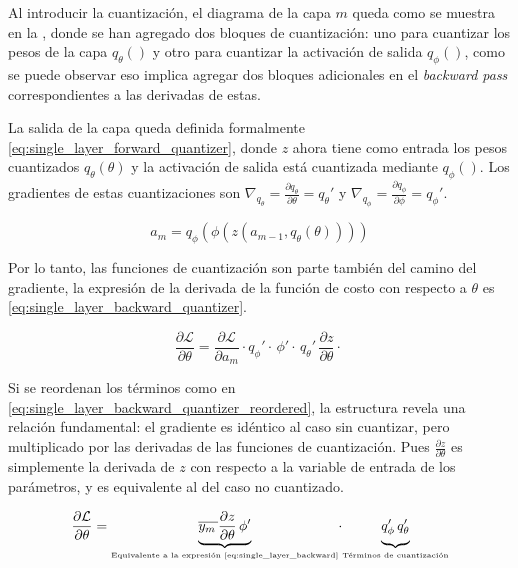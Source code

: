 Al introducir la cuantización, el diagrama de la capa $m$ queda como se muestra en la , donde se han agregado dos bloques de cuantización: uno para cuantizar los pesos de la capa $q_{\theta}()$ y otro para cuantizar la activación de salida $q_{\phi}()$, como se puede observar eso implica agregar dos bloques adicionales en el \textit{backward pass} correspondientes a las derivadas de estas.


La salida de la capa queda definida formalmente \eqref{eq:single_layer_forward_quantizer}, donde $z$ ahora tiene como entrada los pesos cuantizados $q_{\theta}(\theta)$ y la activación de salida está cuantizada mediante $q_{\phi}()$. Los gradientes de estas cuantizaciones son $\nabla_{q_{\theta}} = \frac{\partial q_{\theta}}{\partial \theta} = q_{\theta}'$ y $\nabla_{q_{\phi}} = \frac{\partial q_{\phi}}{\partial \phi} = q_{\phi}'$.

\begin{equation}
    \label{eq:single_layer_forward_quantizer}
    a_{m} = q_{\phi}(\phi(z(a_{m-1}, q_{\theta}(\theta))))
\end{equation}

Por lo tanto, las funciones de cuantización son parte también del camino del gradiente, la expresión de la derivada de la función de costo con respecto a $\theta$ es \eqref{eq:single_layer_backward_quantizer}.

\begin{equation}
    \label{eq:single_layer_backward_quantizer}
    \frac{\partial \mathcal{L}}{\partial \theta} =
    \frac{\partial \mathcal{L}}{\partial a_{m}} \cdot
        q_{\phi}' \cdot \,
        \phi' \cdot \,
        q_{\theta}' \,
        \frac{\partial z}{\partial \theta} \cdot \,
\end{equation}

Si se reordenan los términos como en \eqref{eq:single_layer_backward_quantizer_reordered}, la estructura revela una relación fundamental: el gradiente es idéntico al caso sin cuantizar, pero multiplicado por las derivadas de las funciones de cuantización. Pues $\frac{\partial z}{\partial \theta}$ es simplemente la derivada de $z$ con respecto a la variable de entrada de los par\'ametros, y es equivalente al del caso no cuantizado.

\begin{equation}
    \label{eq:single_layer_backward_quantizer_reordered}
    \frac{\partial \mathcal{L}}{\partial \theta} =
    \underbrace{\overline{y_{m}\,}\dfrac{\partial z}{\partial \theta}\,\phi'}_{\text{\tiny Equivalente a la expresión \eqref{eq:single_layer_backward}}}\!\cdot\!\underbrace{q_{\phi}'\,q_{\theta}'\vphantom{\dfrac{\partial z}{\partial \theta}}}_{\text{\tiny Términos de cuantización}}
\end{equation}

